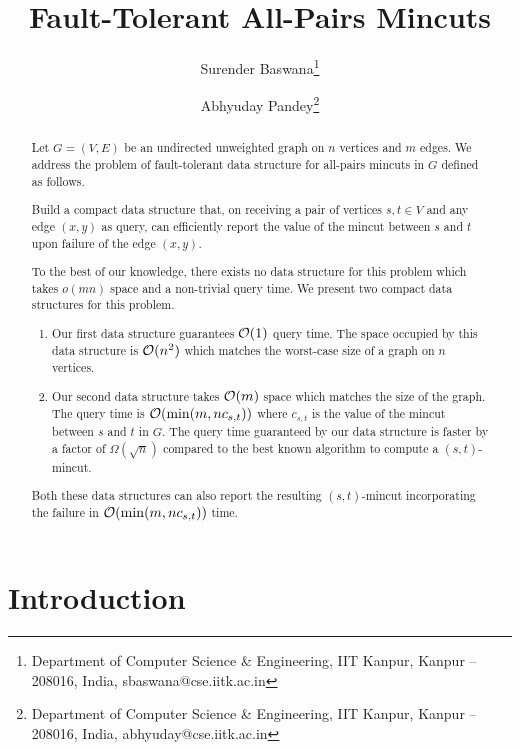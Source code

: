 \documentclass[letterpaper,11pt]{article}
\begin{document}
\begin{titlepage}

\title{Fault-Tolerant All-Pairs Mincuts}
\author{
  Surender Baswana\thanks{Department of Computer Science \& Engineering, IIT Kanpur, Kanpur -- 208016, India, sbaswana@cse.iitk.ac.in}
  \and
  Abhyuday Pandey\thanks{Department of Computer Science \& Engineering, IIT Kanpur, Kanpur -- 208016, India, abhyuday@cse.iitk.ac.in}
}
\maketitle

\begin{abstract}
Let $G=(V,E)$ be an undirected unweighted graph on $n$ vertices and $m$ edges. We address the problem of fault-tolerant data structure for all-pairs mincuts in $G$ defined as follows.

Build a compact data structure that, on receiving a pair of vertices $s,t\in V$ and any edge $(x,y)$ as query, can efficiently report the value of the mincut between $s$ and $t$ upon failure of the edge $(x,y)$.

To the best of our knowledge, there exists no data structure for this problem which takes $o(mn)$ space and a non-trivial query time. We present two compact data structures for this problem.
\begin{enumerate}
\item Our first data structure guarantees ${\cal O}(1)$ query time. The space occupied by this data structure is ${\cal O}(n^2)$ which matches the worst-case size of a graph on $n$ vertices.
\item
Our second data structure takes ${\cal O}(m)$ space which 
matches the size of the graph. The query time is ${\cal O}(\min(m,n c_{s,t}))$ where $c_{s,t}$ is the value of the mincut between $s$ and $t$ in $G$. The query time guaranteed by our data structure is faster by a factor of $\Omega(\sqrt{n})$ compared to the best known algorithm \cite{DBLP:conf/focs/GoldbergR97a,DBLP:conf/stoc/KargerL98} to compute a $(s,t)$-mincut.
\end{enumerate}


Both these data structures can also report the resulting $(s,t)$-mincut incorporating the failure in ${\cal O}(\min(m,n c_{s,t}))$ time.

\end{abstract}
\end{titlepage}
\pagebreak
{}
\section{Introduction}

\end{document}
